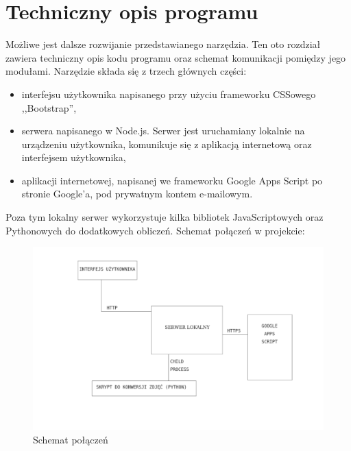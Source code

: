 \chapter{Techniczny opis programu} 
Możliwe jest dalsze rozwijanie przedstawianego narzędzia. Ten oto rozdział zawiera techniczny opis kodu programu oraz schemat komunikacji pomiędzy jego modułami.
\ind Narzędzie składa się z trzech głównych części:
\begin{itemize}
\item interfejsu użytkownika napisanego przy użyciu frameworku CSSowego ,,Bootstrap'',
\item serwera napisanego w Node.js. Serwer jest uruchamiany lokalnie na urządzeniu użytkownika, komunikuje się z aplikacją internetową oraz interfejsem użytkownika,
\item aplikacji internetowej, napisanej we frameworku Google Apps Script po stronie Google'a, pod prywatnym kontem e-mailowym.


\end{itemize}
Poza tym lokalny serwer wykorzystuje kilka bibliotek JavaScriptowych oraz Pythonowych do dodatkowych obliczeń. Schemat połączeń w projekcie:
\begin{figure}[H]
  \includegraphics[scale=0.75]{schemat.png}
  \caption{Schemat połączeń}
  \label{fig:1}
\end{figure}
